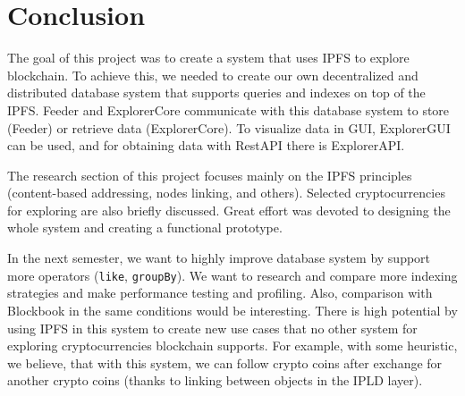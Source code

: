 \chapter{Conclusion}
\label{Conclusion}

The goal of this project was to create a system that uses IPFS to explore blockchain. To achieve this, we needed to create our own decentralized and distributed database system that supports queries and indexes on top of the IPFS. Feeder and ExplorerCore communicate with this database system to store (Feeder) or retrieve data (ExplorerCore). To visualize data in GUI, ExplorerGUI can be used, and for obtaining data with RestAPI there is ExplorerAPI.

The research section of this project focuses mainly on the IPFS principles (content-based addressing, nodes linking, and others). Selected cryptocurrencies for exploring are also briefly discussed. Great effort was devoted to designing the whole system and creating a functional prototype.

In the next semester, we want to highly improve database system by support more operators (\texttt{like}, \texttt{groupBy}). We want to research and compare more indexing strategies and make performance testing and profiling. Also, comparison with Blockbook in the same conditions would be interesting. There is high potential by using IPFS in this system to create new use cases that no other system for exploring cryptocurrencies blockchain supports. For example, with some heuristic, we believe, that with this system, we can follow crypto coins after exchange for another crypto coins (thanks to linking between objects in the IPLD layer).

